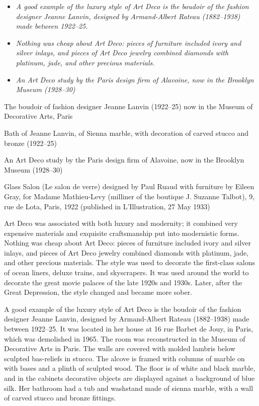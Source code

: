 \begin{itemize}
\item
  \emph{A good example of the luxury style of Art Deco is the boudoir of
  the fashion designer Jeanne Lanvin, designed by Armand-Albert Rateau
  (1882--1938) made between 1922--25.}
\item
  \emph{Nothing was cheap about Art Deco: pieces of furniture included
  ivory and silver inlays, and pieces of Art Deco jewelry combined
  diamonds with platinum, jade, and other precious materials.}
\item
  \emph{An Art Deco study by the Paris design firm of Alavoine, now in
  the Brooklyn Museum (1928--30)}
\end{itemize}

The boudoir of fashion designer Jeanne Lanvin (1922--25) now in the
Museum of Decorative Arts, Paris

Bath of Jeanne Lanvin, of Sienna marble, with decoration of carved
stucco and bronze (1922--25)

An Art Deco study by the Paris design firm of Alavoine, now in the
Brooklyn Museum (1928--30)

Glass Salon (Le salon de verre) designed by Paul Ruaud with furniture by
Eileen Gray, for Madame Mathieu-Levy (milliner of the boutique J.
Suzanne Talbot), 9, rue de Lota, Paris, 1922 (published in
L'Illustration, 27 May 1933)

Art Deco was associated with both luxury and modernity; it combined very
expensive materials and exquisite craftsmanship put into modernistic
forms. Nothing was cheap about Art Deco: pieces of furniture included
ivory and silver inlays, and pieces of Art Deco jewelry combined
diamonds with platinum, jade, and other precious materials. The style
was used to decorate the first-class salons of ocean liners, deluxe
trains, and skyscrapers. It was used around the world to decorate the
great movie palaces of the late 1920s and 1930s. Later, after the Great
Depression, the style changed and became more sober.

A good example of the luxury style of Art Deco is the boudoir of the
fashion designer Jeanne Lanvin, designed by Armand-Albert Rateau
(1882--1938) made between 1922--25. It was located in her house at 16
rue Barbet de Jouy, in Paris, which was demolished in 1965. The room was
reconstructed in the Museum of Decorative Arts in Paris. The walls are
covered with molded lambris below sculpted bas-reliefs in stucco. The
alcove is framed with columns of marble on with bases and a plinth of
sculpted wood. The floor is of white and black marble, and in the
cabinets decorative objects are displayed against a background of blue
silk. Her bathroom had a tub and washstand made of sienna marble, with a
wall of carved stucco and bronze fittings.


